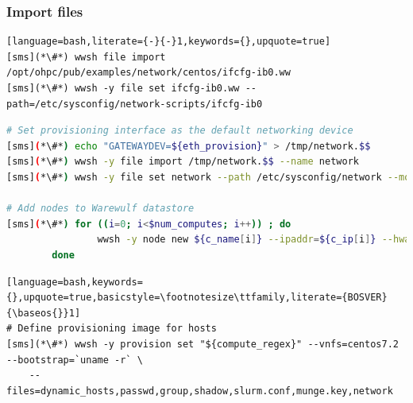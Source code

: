 \documentclass[letterpaper]{article}
\newcommand{\baseos}{centos7.2}
\begin{document}
\subsubsection{Import files} \label{sec:file_import}



\begin{lstlisting}[language=bash,literate={-}{-}1,keywords={},upquote=true]
[sms](*\#*) wwsh file import /opt/ohpc/pub/examples/network/centos/ifcfg-ib0.ww
[sms](*\#*) wwsh -y file set ifcfg-ib0.ww --path=/etc/sysconfig/network-scripts/ifcfg-ib0
\end{lstlisting}




\begin{lstlisting}[language=bash,keywords={},upquote=true,basicstyle=\footnotesize\ttfamily,]
# Set provisioning interface as the default networking device
[sms](*\#*) echo "GATEWAYDEV=${eth_provision}" > /tmp/network.$$
[sms](*\#*) wwsh -y file import /tmp/network.$$ --name network
[sms](*\#*) wwsh -y file set network --path /etc/sysconfig/network --mode=0644 --uid=0

# Add nodes to Warewulf datastore
[sms](*\#*) for ((i=0; i<$num_computes; i++)) ; do
                wwsh -y node new ${c_name[i]} --ipaddr=${c_ip[i]} --hwaddr=${c_mac[i]} -D ${eth_provision}
        done
\end{lstlisting}

\begin{lstlisting}[language=bash,keywords={},upquote=true,basicstyle=\footnotesize\ttfamily,literate={BOSVER}{\baseos{}}1]
# Define provisioning image for hosts
[sms](*\#*) wwsh -y provision set "${compute_regex}" --vnfs=centos7.2 --bootstrap=`uname -r` \
    --files=dynamic_hosts,passwd,group,shadow,slurm.conf,munge.key,network 
\end{lstlisting}
\end{document}
